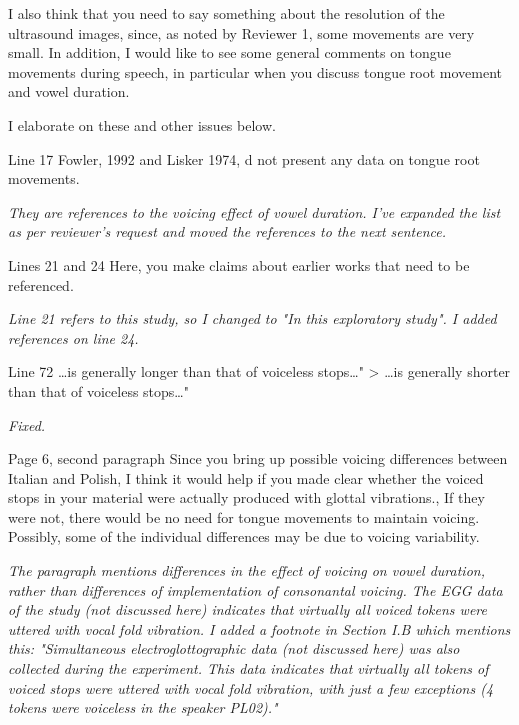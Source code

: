 \documentclass[]{article}
\begin{document}
I also think that you need to say something about the resolution of the
ultrasound images, since, as noted by Reviewer 1, some movements are
very small. In addition, I would like to see some general comments on
tongue movements during speech, in particular when you discuss tongue
root movement and vowel duration.

I elaborate on these and other issues below.

Line 17 Fowler, 1992 and Lisker 1974, d not present any data on tongue
root movements.

\begin{adjustwidth}{1cm}{} \textit{
They are references to the voicing effect of vowel duration. I've expanded the list as per reviewer's request and moved the references to the next sentence.
} \end{adjustwidth}

Lines 21 and 24 Here, you make claims about earlier works that need to
be referenced.

\begin{adjustwidth}{1cm}{} \textit{
Line 21 refers to this study, so I changed to "In this exploratory study". I added references on line 24.
} \end{adjustwidth}

Line 72 \ldots{}is generally longer than that of voiceless
stops\ldots{}" \textgreater{} \ldots{}is generally shorter than that of
voiceless stops\ldots{}"

\begin{adjustwidth}{1cm}{} \textit{
Fixed.
} \end{adjustwidth}

Page 6, second paragraph Since you bring up possible voicing differences
between Italian and Polish, I think it would help if you made clear
whether the voiced stops in your material were actually produced with
glottal vibrations., If they were not, there would be no need for tongue
movements to maintain voicing. Possibly, some of the individual
differences may be due to voicing variability.

\begin{adjustwidth}{1cm}{} \textit{
The paragraph mentions differences in the effect of voicing on vowel duration, rather than differences of implementation of consonantal voicing. The EGG data of the study (not discussed here) indicates that virtually all voiced tokens were uttered with vocal fold vibration. I added a footnote in Section I.B which mentions this: "Simultaneous electroglottographic data (not discussed here) was also collected during the experiment. This data indicates that virtually all tokens of voiced stops were uttered with vocal fold vibration, with just a few exceptions (4 tokens were voiceless in the speaker PL02)."
} \end{adjustwidth}
\end{document}
